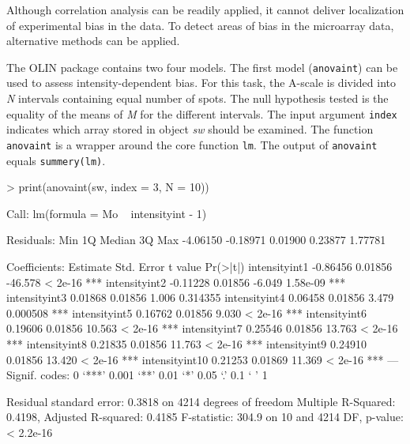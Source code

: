 \documentclass[a4paper,11pt]{article}
\begin{document}
Although correlation analysis can be readily applied, it  cannot 
deliver localization of experimental bias in the data. 
To detect areas of bias in the microarray data, alternative methods can be applied. 

The OLIN package contains two four models. The first model (\texttt{anovaint}) can be used
to assess intensity-dependent bias. For this task, the A-scale is divided into \emph{N} intervals
containing equal number of spots. The null hypothesis tested is the equality of the means of \emph{M} for the different intervals.  The input argument \texttt{index} indicates which array stored in object \emph{sw}
 should
be examined. 
The function \texttt{anovaint}  is a wrapper around the core function \texttt{lm}. 
The output of  \texttt{anovaint} equals \texttt{summery(lm)}.

\begin{Schunk}
\begin{Sinput}
> print(anovaint(sw, index = 3, N = 10))
\end{Sinput}
\begin{Soutput}
Call:
lm(formula = Mo ~ intensityint - 1)

Residuals:
     Min       1Q   Median       3Q      Max 
-4.06150 -0.18971  0.01900  0.23877  1.77781 

Coefficients:
               Estimate Std. Error t value Pr(>|t|)    
intensityint1  -0.86456    0.01856 -46.578  < 2e-16 ***
intensityint2  -0.11228    0.01856  -6.049 1.58e-09 ***
intensityint3   0.01868    0.01856   1.006 0.314355    
intensityint4   0.06458    0.01856   3.479 0.000508 ***
intensityint5   0.16762    0.01856   9.030  < 2e-16 ***
intensityint6   0.19606    0.01856  10.563  < 2e-16 ***
intensityint7   0.25546    0.01856  13.763  < 2e-16 ***
intensityint8   0.21835    0.01856  11.763  < 2e-16 ***
intensityint9   0.24910    0.01856  13.420  < 2e-16 ***
intensityint10  0.21253    0.01869  11.369  < 2e-16 ***
---
Signif. codes:  0 `***' 0.001 `**' 0.01 `*' 0.05 `.' 0.1 ` ' 1 

Residual standard error: 0.3818 on 4214 degrees of freedom
Multiple R-Squared: 0.4198,	Adjusted R-squared: 0.4185 
F-statistic: 304.9 on 10 and 4214 DF,  p-value: < 2.2e-16 
\end{Soutput}
\end{Schunk}
\end{document}
